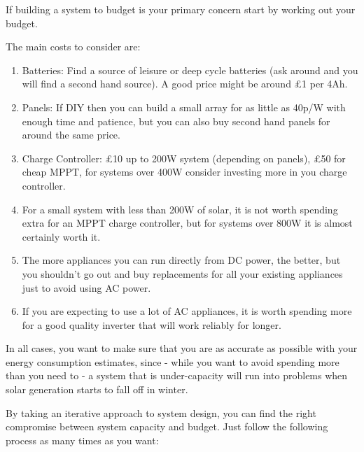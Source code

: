 \documentclass{article}
\theoremstyle{definition}
\theoremstyle{definition}
\theoremstyle{remark}
\begin{document}
    If building a system to budget is your primary concern start by working out your budget. 

    The main costs to consider are:

    \begin{enumerate}
      \item Batteries: Find a source of leisure or deep cycle batteries (ask around and you will find a second hand source). A good price might be around £1 per 4Ah.
      \item Panels: If DIY then you can build a small array for as little as 40p/W with enough time and patience, but you can also buy second hand panels for around the same price.
      \item Charge Controller: £10 up to 200W system (depending on panels), £50 for cheap MPPT, for systems over 400W consider investing more in you charge controller.
      \item For a small system with less than 200W of solar, it is not worth spending extra for an MPPT charge controller, but for systems over 800W it is almost certainly worth it.
      \item The more appliances you can run directly from DC power, the better, but you shouldn’t go out and buy replacements for all your existing appliances just to avoid using AC power.
      \item If you are expecting to use a lot of AC appliances, it is worth spending more for a good quality inverter that will work reliably for longer.
    \end{enumerate}

    In all cases, you want to make sure that you are as accurate as possible with your energy consumption estimates, since - while you want to avoid spending more than you need to - a system that is under-capacity will run into problems when solar generation starts to fall off in winter.

    By taking an iterative approach to system design, you can find the right compromise between system capacity and budget. Just follow the following process as many times as you want:
\end{document}
